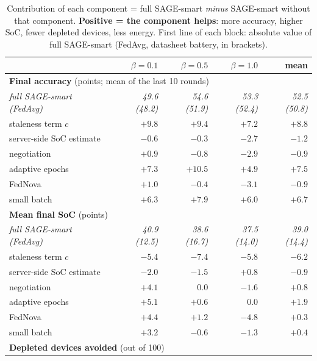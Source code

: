 \documentclass[11pt,a4paper]{article}
\begin{document}
\begin{table}[H]
\centering
\caption{Contribution of each component = full SAGE-smart \emph{minus}
SAGE-smart without that component. \textbf{Positive = the component helps}:
more accuracy, higher SoC, fewer depleted devices, less energy. First line of
each block: absolute value of full SAGE-smart (FedAvg, datasheet battery, in
brackets).}
\label{tab:ablation}
\begin{tabular}{lrrrr}
\toprule
& $\beta=0.1$ & $\beta=0.5$ & $\beta=1.0$ & \textbf{mean} \\
\midrule
\multicolumn{5}{l}{\textbf{Final accuracy} (points; mean of the last 10 rounds)} \\
\quad \emph{full SAGE-smart (FedAvg)} & \emph{49.6 (48.2)} & \emph{54.6 (51.9)} & \emph{53.3 (52.4)} & \emph{52.5 (50.8)} \\
\quad staleness term $c$        & $+9.8$ & $+9.4$  & $+7.2$ & $\mathbf{+8.8}$ \\
\quad server-side SoC estimate  & $-0.6$ & $-0.3$  & $-2.7$ & $\mathbf{-1.2}$ \\
\quad negotiation               & $+0.9$ & $-0.8$  & $-2.9$ & $\mathbf{-0.9}$ \\
\quad adaptive epochs           & $+7.3$ & $+10.5$ & $+4.9$ & $\mathbf{+7.5}$ \\
\quad FedNova                   & $+1.0$ & $-0.4$  & $-3.1$ & $\mathbf{-0.9}$ \\
\quad small batch               & $+6.3$ & $+7.9$  & $+6.0$ & $\mathbf{+6.7}$ \\
\midrule
\multicolumn{5}{l}{\textbf{Mean final SoC} (points)} \\
\quad \emph{full SAGE-smart (FedAvg)} & \emph{40.9 (12.5)} & \emph{38.6 (16.7)} & \emph{37.5 (14.0)} & \emph{39.0 (14.4)} \\
\quad staleness term $c$        & $-5.4$ & $-7.4$ & $-5.8$ & $\mathbf{-6.2}$ \\
\quad server-side SoC estimate  & $-2.0$ & $-1.5$ & $+0.8$ & $\mathbf{-0.9}$ \\
\quad negotiation               & $+4.1$ & $0.0$  & $-1.6$ & $\mathbf{+0.8}$ \\
\quad adaptive epochs           & $+5.1$ & $+0.6$ & $0.0$  & $\mathbf{+1.9}$ \\
\quad FedNova                   & $+4.4$ & $+1.2$ & $-4.8$ & $\mathbf{+0.3}$ \\
\quad small batch               & $+3.2$ & $-0.6$ & $-1.3$ & $\mathbf{+0.4}$ \\
\midrule
\multicolumn{5}{l}{\textbf{Depleted devices avoided} (out of 100)} \\

\end{tabular}
\end{table}
\end{document}
